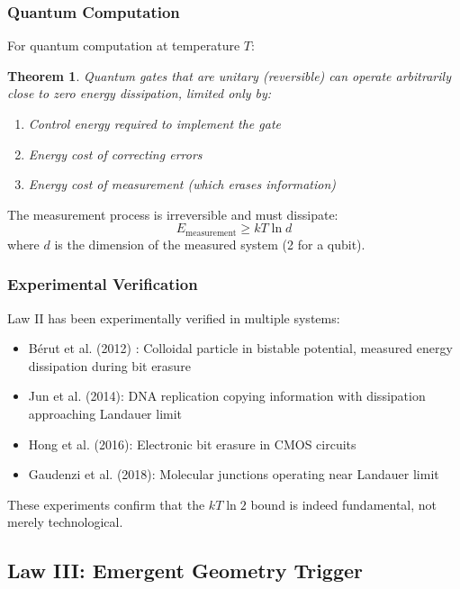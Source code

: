 \documentclass[11pt,a4paper]{article}
\theoremstyle{plain}
\newtheorem{theorem}{Theorem}[section]
\theoremstyle{definition}
\theoremstyle{remark}
\begin{document}
\subsubsection{Quantum Computation}

For quantum computation at temperature $T$:

\begin{theorem}
Quantum gates that are unitary (reversible) can operate arbitrarily close to zero energy dissipation, limited only by:
\begin{enumerate}
\item Control energy required to implement the gate
\item Energy cost of correcting errors
\item Energy cost of measurement (which erases information)
\end{enumerate}
\end{theorem}

The measurement process is irreversible and must dissipate:
\begin{equation}
E_{\text{measurement}} \geq kT\ln d
\end{equation}
where $d$ is the dimension of the measured system (2 for a qubit).

\subsubsection{Experimental Verification}

Law II has been experimentally verified in multiple systems:

\begin{itemize}[leftmargin=*]
\item Bérut et al. (2012) \cite{berut2012experimental}: Colloidal particle in bistable potential, measured energy dissipation during bit erasure
\item Jun et al. (2014): DNA replication copying information with dissipation approaching Landauer limit
\item Hong et al. (2016): Electronic bit erasure in CMOS circuits
\item Gaudenzi et al. (2018): Molecular junctions operating near Landauer limit
\end{itemize}

These experiments confirm that the $kT\ln 2$ bound is indeed fundamental, not merely technological.

\subsection{Law III: Emergent Geometry Trigger}
\end{document}
